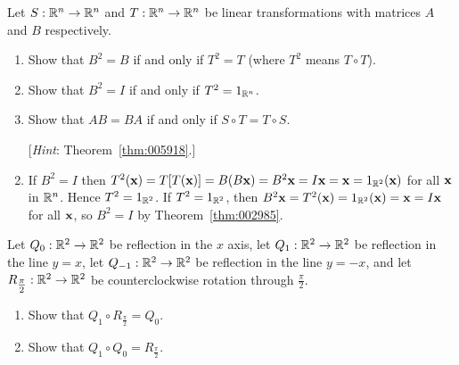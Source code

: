 \begin{multicols}{2}
\begin{ex}
\begin{enumerate}[label={\alph*.}]
\end{enumerate}
\end{ex}

\begin{ex}
Let $S : \mathbb{R}^n \to \mathbb{R}^n$ and $T : \mathbb{R}^n \to \mathbb{R}^n$ be linear transformations with matrices $A$ and $B$ respectively.

\begin{enumerate}[label={\alph*.}]
\item Show that $B^{2} = B$ if and only if $T^{2} = T$ (where $T^{2}$ means $T \circ T$).

\item Show that $B^{2} = I$ if and only if $T^2 = 1_{\mathbb{R}^n}$.

\item Show that $AB = BA$ if and only if $S \circ T = T \circ S$.

\item[] [\textit{Hint}: Theorem~\ref{thm:005918}.]
\end{enumerate}


\begin{sol}
\begin{enumerate}[label={\alph*.}]
\setcounter{enumi}{1}
\item  If $B^{2} = I$ then $T^{2}(\textbf{x}) = T[T(\textbf{x})] = B(B\textbf{x}) = B^{2}\textbf{x} = I\textbf{x} = \textbf{x} = 1_{\mathbb{R}^2}(\textbf{x})$ for all $\textbf{x}$ in $\mathbb{R}^n$. Hence $T^{2} = 1_{\mathbb{R}^2}$. If $T^{2} = 1_{\mathbb{R}^2}$, then $B^{2}\textbf{x} = T^{2}(\textbf{x}) = 1_{\mathbb{R}^2}(\textbf{x}) = \textbf{x} = I\textbf{x}$ for all $\textbf{x}$, so $B^{2} = I$ by Theorem~\ref{thm:002985}.

\end{enumerate}
\end{sol}
\end{ex}

\columnbreak
\begin{ex}
Let $Q_{0} : \mathbb{R}^2 \to \mathbb{R}^2$ be reflection in the $x$ axis, let $Q_{1} : \mathbb{R}^2 \to \mathbb{R}^2$ be reflection in the line $y = x$, let $Q_{-1} : \mathbb{R}^2 \to \mathbb{R}^2$ be reflection in the line $y = -x$, and let $R_{\tfrac{\pi}{2}} : \mathbb{R}^2 \to \mathbb{R}^2$ be counterclockwise rotation through $\frac{\pi}{2}$.

\begin{enumerate}[label={\alph*.}]
\item Show that $Q_{1} \circ R_{\frac{\pi}{2}} = Q_{0}$.

\item Show that $Q_{1} \circ Q_{0} = R_{\frac{\pi}{2}}$.


\end{enumerate}
\end{ex}
\end{multicols}
